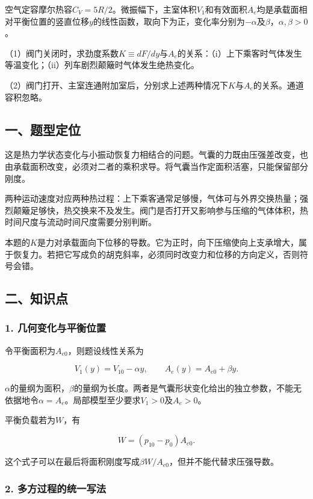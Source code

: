 \documentclass[12pt,a4paper,fontset=fandol]{ctexart}
\begin{document}
空气定容摩尔热容\(C_V=5R/2\)。微振幅下，主室体积\(V_1\)和有效面积\(A_e\)均是承载面相对平衡位置的竖直位移\(y\)的线性函数，取向下为正，变化率分别为\(-\alpha\)及\(\beta\)，\(\alpha,\beta>0\)。

（1）阀门关闭时，求劲度系数\(K\equiv dF/dy\)与\(A_e\)的关系：（i）上下乘客时气体发生等温变化；（ii）列车剧烈颠簸时气体发生绝热变化。

（2）阀门打开、主室连通附加室后，分别求上述两种情况下\(K\)与\(A_e\)的关系。通道容积忽略。

\subsection{一、题型定位}\label{ux4e00ux9898ux578bux5b9aux4f4d}

这是热力学状态变化与小振动恢复力相结合的问题。气囊的力既由压强差改变，也由承载面积改变，必须对二者的乘积求导。将气囊当作定面积活塞，只能保留部分刚度。

两种运动速度对应两种热过程：上下乘客通常足够慢，气体可与外界交换热量；强烈颠簸足够快，热交换来不及发生。阀门是否打开又影响参与压缩的气体体积，热时间尺度与流动时间尺度需要分别判断。

本题的\(K\)是力对承载面向下位移的导数。它为正时，向下压缩使向上支承增大，属于恢复力。若把它写成负的胡克斜率，必须同时改变力和位移的方向定义，否则符号会错。

\subsection{二、知识点}\label{ux4e8cux77e5ux8bc6ux70b9}

\subsubsection{1.
几何变化与平衡位置}\label{ux51e0ux4f55ux53d8ux5316ux4e0eux5e73ux8861ux4f4dux7f6e}

令平衡面积为\(A_{e0}\)，则题设线性关系为

\[
V_1(y)=V_{10}-\alpha y,\qquad
A_e(y)=A_{e0}+\beta y.
\]

\(\alpha\)的量纲为面积，\(\beta\)的量纲为长度。两者是气囊形状变化给出的独立参数，不能无依据地令\(\alpha=A_e\)。局部模型至少要求\(V_1>0\)及\(A_e>0\)。

平衡负载若为\(W\)，有

\[
W=(p_{10}-p_0)A_{e0}.
\]

这个式子可以在最后将面积刚度写成\(\beta W/A_{e0}\)，但并不能代替求压强导数。

\subsubsection{2.
多方过程的统一写法}\label{ux591aux65b9ux8fc7ux7a0bux7684ux7edfux4e00ux5199ux6cd5}
\end{document}
